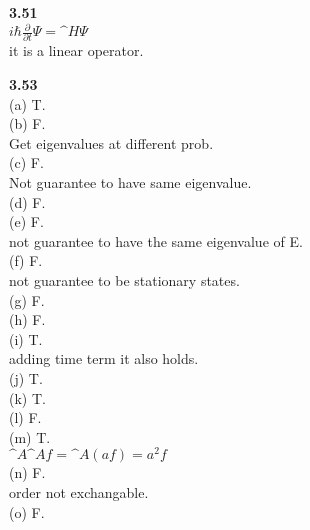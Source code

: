 \documentclass{article}
\begin{document}
\textbf{3.51}\\
$i\hbar\frac{\partial}{\partial t}\Psi = \^{H}\Psi$\\
it is a linear operator.\\
\newline

\textbf{3.53}\\
(a) T.\\
(b) F.\\
Get eigenvalues at different prob.\\
(c) F.\\
Not guarantee to have same eigenvalue.\\
(d) F.\\
(e) F.\\
not guarantee to have the same eigenvalue of E.\\
(f) F.\\
not guarantee to be stationary states.\\
(g) F.\\
(h) F.\\
(i) T.\\
adding time term it also holds.\\
(j) T.\\
(k) T.\\
(l) F.\\
(m) T.\\
$\^{A}\^{A}f = \^{A}(af) = a^2f$\\
(n) F.\\
order not exchangable.\\
(o) F.\\
\newline
\end{document}
